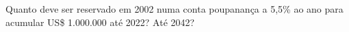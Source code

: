 Quanto deve ser reservado em 2002 numa conta poupanan\c{c}a a 5,5\% ao ano para acumular US\$ 1.000.000 até 2022? Até 2042?

